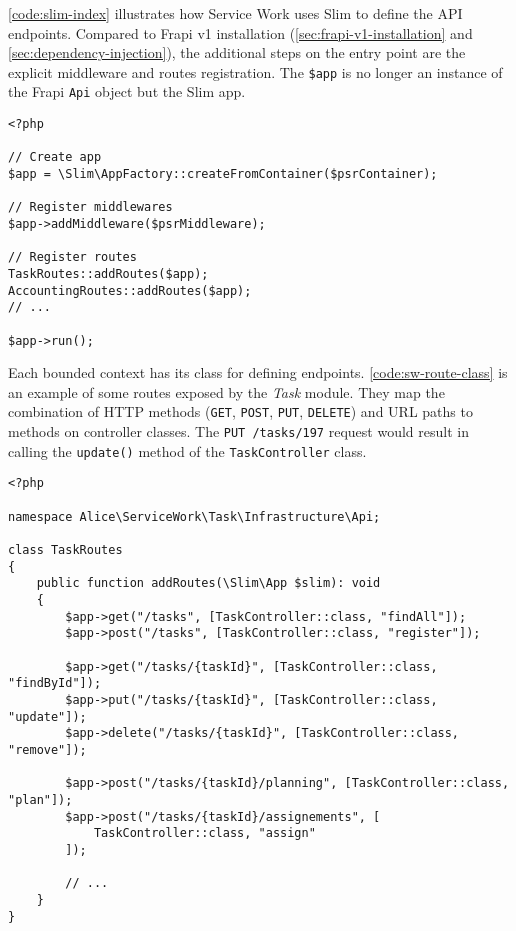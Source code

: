 \autoref{code:slim-index} illustrates how Service Work uses Slim to define the API endpoints. Compared to Frapi v1 installation (\autoref{sec:frapi-v1-installation} and \autoref{sec:dependency-injection}), the additional steps on the entry point are the explicit middleware and routes registration. The \texttt{\$app} is no longer an instance of the Frapi \texttt{Api} object but the Slim app.

\begin{listing}[htbp]
\begin{verbatim}
<?php

// Create app
$app = \Slim\AppFactory::createFromContainer($psrContainer);

// Register middlewares
$app->addMiddleware($psrMiddleware);

// Register routes
TaskRoutes::addRoutes($app);
AccountingRoutes::addRoutes($app);
// ...

$app->run();
\end{verbatim}
\caption{API entry point script without Frapi.}
\label{code:slim-index}
\end{listing}

Each bounded context has its class for defining endpoints. \autoref{code:sw-route-class} is an example of some routes exposed by the \textit{Task} module. They map the combination of HTTP methods (\texttt{GET}, \texttt{POST}, \texttt{PUT}, \texttt{DELETE}) and URL paths to methods on controller classes. The \texttt{PUT /tasks/197} request would result in calling the \texttt{update()} method of the \texttt{TaskController} class.

\begin{listing}[htbp]
\begin{verbatim}
<?php

namespace Alice\ServiceWork\Task\Infrastructure\Api;

class TaskRoutes
{
	public function addRoutes(\Slim\App $slim): void
	{
		$app->get("/tasks", [TaskController::class, "findAll"]);
        $app->post("/tasks", [TaskController::class, "register"]);

        $app->get("/tasks/{taskId}", [TaskController::class, "findById"]);
        $app->put("/tasks/{taskId}", [TaskController::class, "update"]);
        $app->delete("/tasks/{taskId}", [TaskController::class, "remove"]);

		$app->post("/tasks/{taskId}/planning", [TaskController::class, "plan"]);
		$app->post("/tasks/{taskId}/assignements", [
            TaskController::class, "assign"
        ]);

		// ...
	}
}
\end{verbatim}
\caption{HTTP route definitions for the \texttt{Task} bounded context.}
\label{code:sw-route-class}
\end{listing}

